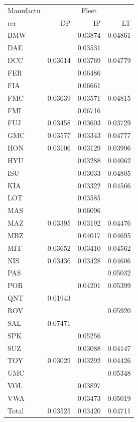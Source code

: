\begin{tabular}{lrrr}
\toprule
Manufactu & \multicolumn{3}{c}{Fleet} \\
rer & DP & IP & LT \\
\midrule
BMW &  & 0.03874 & 0.04861 \\
DAE &  & 0.03531 &  \\
DCC & 0.03614 & 0.03769 & 0.04779 \\
FER &  & 0.06486 &  \\
FIA &  & 0.06661 &  \\
FMC & 0.03639 & 0.03571 & 0.04815 \\
FMI &  & 0.06716 &  \\
FUJ & 0.03458 & 0.03603 & 0.03729 \\
GMC & 0.03577 & 0.03343 & 0.04777 \\
HON & 0.03106 & 0.03129 & 0.03996 \\
HYU &  & 0.03288 & 0.04062 \\
ISU &  & 0.03033 & 0.04805 \\
KIA &  & 0.03322 & 0.04566 \\
LOT &  & 0.03585 &  \\
MAS &  & 0.06096 &  \\
MAZ & 0.03395 & 0.03192 & 0.04476 \\
MBZ &  & 0.04017 & 0.04695 \\
MIT & 0.03652 & 0.03410 & 0.04562 \\
NIS & 0.03436 & 0.03428 & 0.04606 \\
PAS &  &  & 0.05032 \\
POR &  & 0.04201 & 0.05399 \\
QNT & 0.01943 &  &  \\
ROV &  &  & 0.05920 \\
SAL & 0.07471 &  &  \\
SPK &  & 0.05256 &  \\
SUZ &  & 0.03088 & 0.04147 \\
TOY & 0.03029 & 0.03292 & 0.04426 \\
UMC &  &  & 0.05348 \\
VOL &  & 0.03897 &  \\
VWA &  & 0.03473 & 0.05019 \\
Total & 0.03525 & 0.03420 & 0.04711 \\
\bottomrule
\end{tabular}

